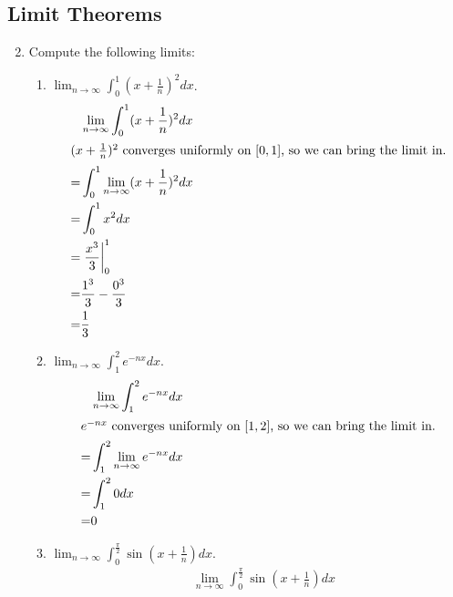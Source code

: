 \documentclass{article}
\begin{document}
\subsection{Limit Theorems}
\begin{enumerate}
      \setcounter{enumi}{1}
      \item Compute the following limits:
            \begin{enumerate}
                  \item $\lim_{n\to \infty}\int_0^1(x+\frac{1}{n})^2dx$.
                        \begin{align*}
                                & \lim_{n\to \infty}\int_0^1(x+\frac{1}{n})^2dx \\
                              \intertext{$(x+\frac{1}{n})^2$ converges uniformly on $[0,1]$, so we can bring the limit in.}
                              = & \int_0^1\lim_{n\to \infty}(x+\frac{1}{n})^2dx \\
                              = & \int_0^1x^2dx                                 \\
                              = & \left.\frac{x^3}{3}\right\rvert_0^1           \\
                              = & \frac{1^3}{3}-\frac{0^3}{3}                   \\
                              = & \frac{1}{3}
                        \end{align*}
                  \item $\lim_{n\to \infty}\int_1^2e^{-nx}dx$.
                        \begin{align*}
                                & \lim_{n\to \infty}\int_1^2e^{-nx}dx \\
                              \intertext{$e^{-nx}$ converges uniformly on $[1,2]$, so we can bring the limit in.}
                              = & \int_1^2\lim_{n\to \infty}e^{-nx}dx \\
                              = & \int_1^20dx                         \\
                              = & 0
                        \end{align*}
                  \item $\lim_{n\to \infty}\int_0^{\frac{\pi}{2}}
                              \sin (x+\frac{1}{n})dx$.
                        \begin{align*}
                                & \lim_{n\to \infty}\int_0^{\frac{\pi}{2}}\sin (x+\frac{1}{n})dx \\

\end{align*}
\end{enumerate}
\end{enumerate}
\end{document}
